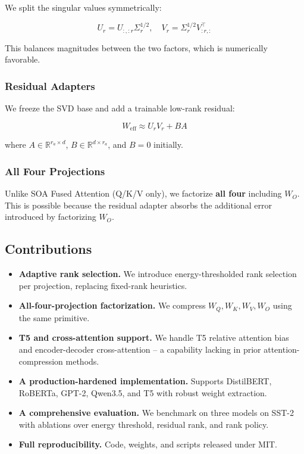 We split the singular values symmetrically:

\begin{equation}
U_r = U_{:, :r} \Sigma_r^{1/2}, \quad V_r = \Sigma_r^{1/2} V_{:r, :}^\top
\end{equation}

This balances magnitudes between the two factors, which is numerically 
favorable.

\subsubsection{Residual Adapters}

We freeze the SVD base and add a trainable low-rank residual:

\begin{equation}
W_\text{eff} \approx U_r V_r + B A
\end{equation}

where $A \in \mathbb{R}^{r_a \times d}$, $B \in \mathbb{R}^{d \times r_a}$, and 
$B = 0$ initially.

\subsubsection{All Four Projections}

Unlike SOA Fused Attention (Q/K/V only), we factorize \textbf{all four} including 
$W_O$. This is possible because the residual adapter absorbs the additional 
error introduced by factorizing $W_O$.

\subsection{Contributions}

\begin{itemize}
\item \textbf{Adaptive rank selection.} We introduce energy-thresholded rank
  selection per projection, replacing fixed-rank heuristics.
\item \textbf{All-four-projection factorization.} We compress $W_Q, W_K, W_V, W_O$
  using the same primitive.
\item \textbf{T5 and cross-attention support.} We handle T5 relative attention bias
  and encoder-decoder cross-attention -- a capability lacking in prior
  attention-compression methods.
\item \textbf{A production-hardened implementation.} Supports DistilBERT, RoBERTa,
  GPT-2, Qwen3.5, and T5 with robust weight extraction.
\item \textbf{A comprehensive evaluation.} We benchmark on three models on SST-2 with
  ablations over energy threshold, residual rank, and rank policy.
\item \textbf{Full reproducibility.} Code, weights, and scripts released under MIT.

\end{itemize}
